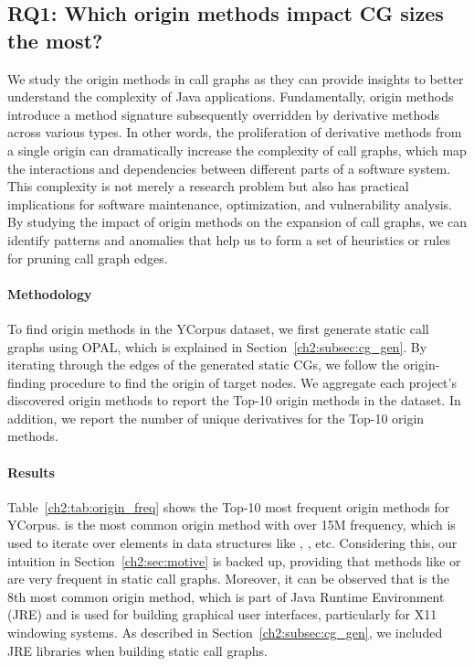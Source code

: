 \subsection{\textbf{RQ1}: Which origin methods impact CG sizes the most?}
We study the origin methods in call graphs as they can provide insights to better understand the complexity of Java applications. Fundamentally, origin methods introduce a method signature subsequently overridden by derivative methods across various types. In other words, the proliferation of derivative methods from a single origin can dramatically increase the complexity of call graphs, which map the interactions and dependencies between different parts of a software system. This complexity is not merely a research problem but also has practical implications for software maintenance, optimization, and vulnerability analysis. By studying the impact of origin methods on the expansion of call graphs, we can identify patterns and anomalies that help us to form a set of heuristics or rules for pruning call graph edges.

\paragraph{Methodology}
To find origin methods in the YCorpus dataset, we first generate static call graphs using OPAL, which is explained in Section~\ref{ch2:subsec:cg_gen}. By iterating through the edges of the generated static CGs, we follow the origin-finding procedure to find the origin of target nodes. We aggregate each project's discovered origin methods to report the Top-10 origin methods in the dataset. In addition, we report the number of unique derivatives for the Top-10 origin methods.

\paragraph{Results}
Table~\ref{ch2:tab:origin_freq} shows the Top-10 most frequent origin methods for YCorpus.  is the most common origin method with over 15M frequency, which is used to iterate over elements in data structures like , , etc. Considering this, our intuition in Section~\ref{ch2:sec:motive} is backed up, providing that methods like  or  are very frequent in static call graphs. Moreover, it can be observed that  is the 8th most common origin method, which is part of Java Runtime Environment (JRE) and is used for building graphical user interfaces, particularly for X11 windowing systems. As described in Section~\ref{ch2:subsec:cg_gen}, we included JRE libraries when building static call graphs.

